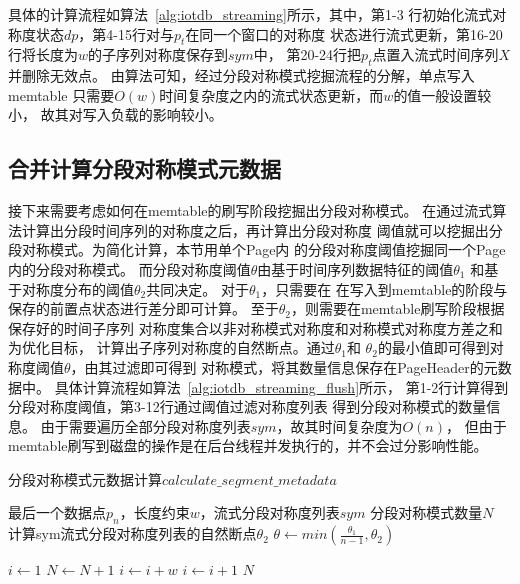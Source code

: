 具体的计算流程如算法~\ref{alg:iotdb_streaming}所示，其中，第1-3
行初始化流式对称度状态$dp$，第4-15行对与$p_t$在同一个窗口的对称度
状态进行流式更新，第16-20行将长度为$w$的子序列对称度保存到$sym$中，
第20-24行把$p_t$点置入流式时间序列$X$并删除无效点。
由算法可知，经过分段对称模式挖掘流程的分解，单点写入memtable
只需要$O(w)$时间复杂度之内的流式状态更新，而$w$的值一般设置较小，
故其对写入负载的影响较小。

\subsection{合并计算分段对称模式元数据}

接下来需要考虑如何在memtable的刷写阶段挖掘出分段对称模式。
在通过流式算法计算出分段时间序列的对称度之后，再计算出分段对称度
阈值就可以挖掘出分段对称模式。为简化计算，本节用单个Page内
的分段对称度阈值挖掘同一个Page内的分段对称模式。
而分段对称度阈值$\theta$由基于时间序列数据特征的阈值$\theta_1$
和基于对称度分布的阈值$\theta_2$共同决定。
对于$\theta_1$，只需要在
在写入到memtable的阶段与保存的前置点状态进行差分即可计算。
至于$\theta_2$，则需要在memtable刷写阶段根据保存好的时间子序列
对称度集合以非对称模式对称度和对称模式对称度方差之和为优化目标，
计算出子序列对称度的自然断点。通过$\theta_1$和
$\theta_2$的最小值即可得到对称度阈值$\theta$，由其过滤即可得到
对称模式，将其数量信息保存在PageHeader的元数据中。
具体计算流程如算法~\ref{alg:iotdb_streaming_flush}所示，
第1-2行计算得到分段对称度阈值，第3-12行通过阈值过滤对称度列表
得到分段对称模式的数量信息。
由于需要遍历全部分段对称度列表$sym$，故其时间复杂度为$O(n)$，
但由于memtable刷写到磁盘的操作是在后台线程并发执行的，并不会过分影响性能。

\renewcommand{\algorithmicrequire}{\textbf{输入：}\unskip}
\renewcommand{\algorithmicensure}{\textbf{输出：}\unskip}

\begin{algorithm}
  \caption{分段对称模式元数据计算$calculate\_segment\_metadata$}
  \label{alg:iotdb_streaming_flush}
  \small
  \begin{algorithmic}
    \REQUIRE 最后一个数据点$p_n$，长度约束$w$，流式分段对称度列表$sym$
    \ENSURE 分段对称模式数量$N$
    \STATE 计算sym流式分段对称度列表的自然断点$\theta_2$
    \STATE $\theta \leftarrow min(\frac{\theta_1}{n-1},\theta_2)$

    \STATE $i \leftarrow 1$
    \STATE $N \leftarrow N+1$
    \STATE $i \leftarrow i+w$
    \ELSE
    \STATE $i \leftarrow i+1$
    \ENDIF
    \ENDWHILE
    \RETURN $N$
  \end{algorithmic}
\end{algorithm}


